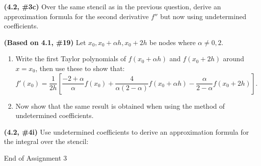 \documentclass{eh-homework}
\begin{document}
\begin{question}{4}
\textbf{(4.2, \#3c)} Over the same stencil as in the previous question, derive an approximation formula for the second derivative \( f'' \) but now using undetermined coefficients.
\end{question}

\begin{question}{5}
\textbf{(Based on 4.1, \#19)} Let \( x_0, x_0 + \alpha h, x_0 + 2h \) be nodes where \( \alpha \neq 0,2 \).

\begin{enumerate}[label=\alph*.]
    \item Write the first Taylor polynomials of \( f(x_0 +\alpha h) \) and \( f(x_0 +2h) \) around \( x = x_0 \), then use these to show that:
    \[
    f'(x_0) = \frac{1}{2h} \left[ \frac{-2+\alpha}{\alpha} f(x_0) + \frac{4}{\alpha(2-\alpha)} f(x_0 + \alpha h) - \frac{\alpha}{2-\alpha} f(x_0 + 2h) \right].
    \]

    \item Now show that the same result is obtained when using the method of undetermined coefficients.
\end{enumerate}
\end{question}

\begin{question}{6}
\textbf{(4.2, \#4i)} Use undetermined coefficients to derive an approximation formula for the integral over the stencil:

\begin{center}
\end{center}

\end{question}

\vfill
\centerline{End of Assignment 3}
\end{document}
